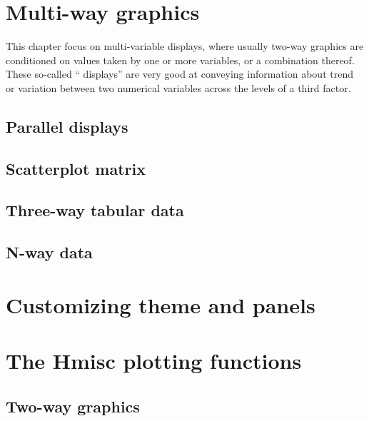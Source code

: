 \documentclass[a4paper,twoside]{book}
\begin{document}
\chapter{Multi-way graphics}

This chapter focus on multi-variable displays, where usually two-way
graphics are conditioned on values taken by one or more variables, or
a combination thereof. These so-called `` displays'' are very
good at conveying information about trend or variation between two
numerical variables across the levels of a third factor.

\section{Parallel displays}

\section{Scatterplot matrix}

\section{Three-way tabular data}

\section{N-way data}

\chapter{Customizing theme and panels}
\label{chap:6}

\chapter{The Hmisc plotting functions}

\section{Two-way graphics}
\end{document}
